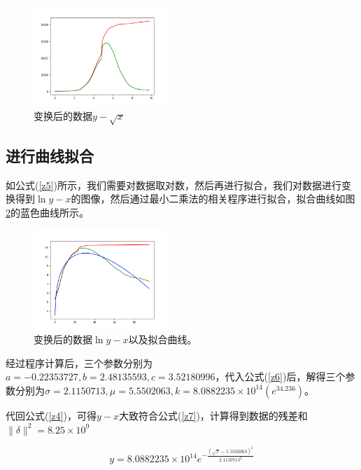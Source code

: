 \documentclass{article}
\begin{document}
\begin{multicols}{2}
                \begin{figure}[H]
                    \centering
                    \includegraphics[width=0.45\textwidth]{plot2.png}
                    \caption{变换后的数据$y-\sqrt{x}$}
                    \label{plot2}
                \end{figure}
            \subsection{进行曲线拟合}
                如公式(\ref{z5})所示，我们需要对数据取对数，然后再进行拟合，我们对数据进行变换得到$\ln{y}-x$的图像，然后通过最小二乘法的相关程序进行拟合，拟合曲线如图\ref{plot3}的蓝色曲线所示。

                \begin{figure}[H]
                    \centering
                    \includegraphics[width=0.45\textwidth]{plot3.png}
                    \caption{变换后的数据$\ln{y}-x$以及拟合曲线。}
                    \label{plot3}
                \end{figure}

                经过程序计算后，三个参数分别为$a=-0.22353727,b=2.48135593,c=3.52180996$，代入公式(\ref{z6})后，解得三个参数分别为$\sigma=2.1150713,\mu=5.5502063,k=8.0882235{\times}10^{14}(e^{34.236})$。

                代回公式(\ref{z4})，可得$y-x$大致符合公式(\ref{z7})，计算得到数据的残差和$\parallel\delta\parallel^2=8.25{\times}10^9$

                \begin{equation}
                    y=8.0882235{\times}10^{14}e^{-\frac{(\sqrt{x}-5.5502063)^2}{2.1150713^2}}
                    \label{z7}
                \end{equation}


\end{multicols}
\end{document}
